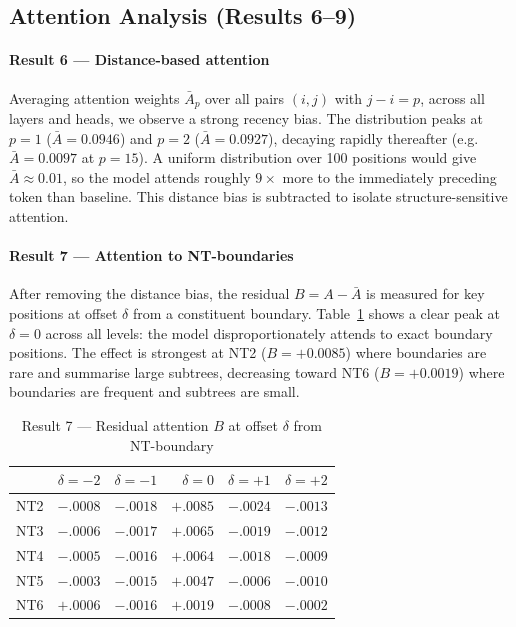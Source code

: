 \documentclass[10pt,twocolumn]{article}
\begin{document}
\subsection{Attention Analysis (Results 6--9)}

\paragraph{Result 6 — Distance-based attention}
Averaging attention weights $\bar{A}_p$ over all pairs $(i,j)$ with $j-i=p$, across all layers and heads, we observe a strong recency bias. The distribution peaks at $p=1$ ($\bar{A}=0.0946$) and $p=2$ ($\bar{A}=0.0927$), decaying rapidly thereafter (e.g.\ $\bar{A}=0.0097$ at $p=15$). A uniform distribution over 100 positions would give $\bar{A}\approx0.01$, so the model attends roughly $9\times$ more to the immediately preceding token than baseline. This distance bias is subtracted to isolate structure-sensitive attention.

\paragraph{Result 7 — Attention to NT-boundaries}
After removing the distance bias, the residual $B = A - \bar{A}$ is measured for key positions at offset $\delta$ from a constituent boundary. Table~\ref{tab:r7} shows a clear peak at $\delta=0$ across all levels: the model disproportionately attends to exact boundary positions. The effect is strongest at NT2 ($B=+0.0085$) where boundaries are rare and summarise large subtrees, decreasing toward NT6 ($B=+0.0019$) where boundaries are frequent and subtrees are small.

\begin{table}[h]
\centering
\caption{Result 7 — Residual attention $B$ at offset $\delta$ from NT-boundary}
\label{tab:r7}
\setlength{\tabcolsep}{4pt}
\small
\begin{tabular}{lrrrrr}
\toprule
& $\delta{=}{-2}$ & $\delta{=}{-1}$ & $\delta{=}0$ & $\delta{=}{+1}$ & $\delta{=}{+2}$ \\
\midrule
NT2 & $-.0008$ & $-.0018$ & $\mathbf{+.0085}$ & $-.0024$ & $-.0013$ \\
NT3 & $-.0006$ & $-.0017$ & $\mathbf{+.0065}$ & $-.0019$ & $-.0012$ \\
NT4 & $-.0005$ & $-.0016$ & $\mathbf{+.0064}$ & $-.0018$ & $-.0009$ \\
NT5 & $-.0003$ & $-.0015$ & $\mathbf{+.0047}$ & $-.0006$ & $-.0010$ \\
NT6 & $+.0006$ & $-.0016$ & $\mathbf{+.0019}$ & $-.0008$ & $-.0002$ \\
\bottomrule
\end{tabular}
\end{table}
\end{document}
